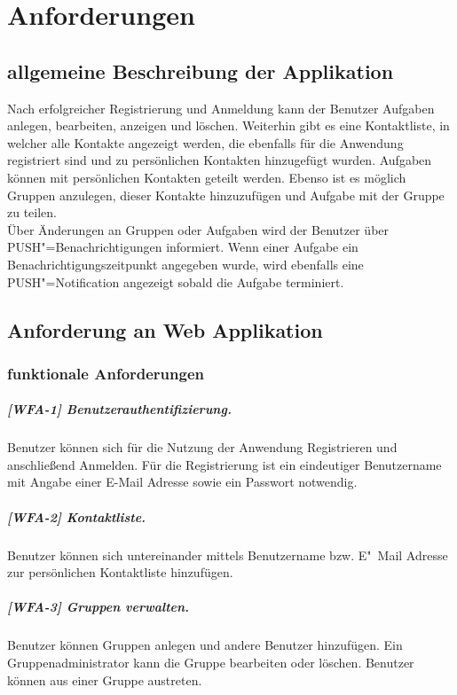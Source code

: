\chapter{Anforderungen}
\section{allgemeine Beschreibung der Applikation}

Nach erfolgreicher Registrierung und Anmeldung kann der Benutzer Aufgaben anlegen, bearbeiten, anzeigen und löschen. Weiterhin gibt es eine Kontaktliste, in welcher alle Kontakte angezeigt werden, die ebenfalls für die Anwendung registriert sind und zu persönlichen Kontakten hinzugefügt wurden. Aufgaben können mit persönlichen Kontakten geteilt werden. Ebenso ist es möglich Gruppen anzulegen, dieser Kontakte hinzuzufügen und Aufgabe mit der Gruppe zu teilen. \\

Über Änderungen an Gruppen oder Aufgaben wird der Benutzer über PUSH"=Benachrichtigungen informiert. Wenn einer Aufgabe ein Benachrichtigungszeitpunkt angegeben wurde, wird ebenfalls eine PUSH"=Notification angezeigt sobald die Aufgabe terminiert.

\newpage
\section{Anforderung an Web Applikation}
\subsection{funktionale Anforderungen}

\paragraph{[WFA-1] Benutzerauthentifizierung.} Benutzer können sich für die Nutzung der Anwendung Registrieren und anschließend Anmelden. Für die Registrierung ist ein eindeutiger Benutzername mit Angabe einer E-Mail Adresse sowie ein Passwort notwendig.

\paragraph{[WFA-2] Kontaktliste.} Benutzer können sich untereinander mittels Benutzername bzw. E"~Mail Adresse zur persönlichen Kontaktliste hinzufügen.

\paragraph{[WFA-3] Gruppen verwalten. } Benutzer können Gruppen anlegen und andere Benutzer hinzufügen. Ein Gruppenadministrator kann die Gruppe bearbeiten oder löschen. Benutzer können aus einer Gruppe austreten.

